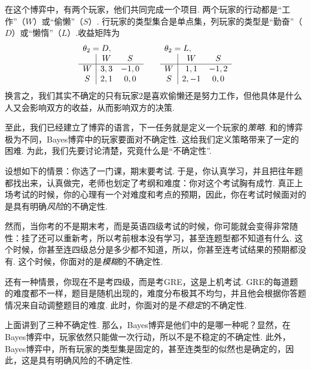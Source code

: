 \begin{example}[“工作还是偷懒”博弈]
    在这个博弈中，有两个玩家，他们共同完成一个项目. 两个玩家的行动都是“工作”（$W$）或“偷懒”（$S$）. 行玩家的类型集合是单点集，列玩家的类型是“勤奋”（$D$）或“懒惰”（$L$）.收益矩阵为
    \[\begin{array}{c|cc}
        \multicolumn{3}{l}{\theta_2=D,}\\
         &W&S  \\\hline
         W&3,3&-1,0\\
         S&2,1&0,0\\
    \end{array}\qquad \begin{array}{c|cc}
        \multicolumn{3}{l}{\theta_2=L,}\\
         &W&S  \\\hline
         W&1,1&-1,2\\
         S&2,-1&0,0\\
    \end{array}\]
    换言之，我们其实不确定的只有玩家$2$是喜欢偷懒还是努力工作，但他具体是什么人又会影响双方的收益，从而影响双方的决策. 
\end{example}

至此，我们已经建立了博弈的语言，下一任务就是定义一个玩家的\textit{策略}. 和的博弈极为不同，Bayes博弈中的玩家要面对不确定性. 这给我们定义策略带来了一定的困难. 为此，我们先要讨论清楚，究竟什么是“不确定性”. 

设想如下的情景：你选了一门课，期末要考试. 于是，你认真学习，并且把往年题都找出来，认真做完，老师也划定了考纲和难度：你对这个考试胸有成竹. 真正上场考试的时候，你的心理有一个对难度和考点的预期，因此，你在考试时候面对的是具有明确\textit{风险}的不确定性. 

然而，当你考的不是期末考，而是英语四级考试的时候，你可能就会变得非常随性：挂了还可以重新考，所以考前根本没有学习，甚至连题型都不知道有什么. 这个时候，你甚至连四级总分是多少都不知道，所以，你甚至连考试结果的预期都没有. 这个时候，你面对的是\textit{模糊}的不确定性. 

还有一种情景，你现在不是考四级，而是考GRE，这是上机考试. GRE的每道题的难度都不一样，题目是随机出现的，难度分布极其不均匀，并且他会根据你答题情况来自动调整题目的难度. 此时，你面对的是\textit{不稳定}的不确定性. 

上面讲到了三种不确定性. 那么，Bayes博弈是他们中的是哪一种呢？显然，在Bayes博弈中，玩家依然只能做一次行动，所以不是不稳定的不确定性. 此外，Bayes博弈中，所有玩家的类型集是固定的，甚至连类型的似然也是确定的，因此，这是具有明确风险的不确定性. 

